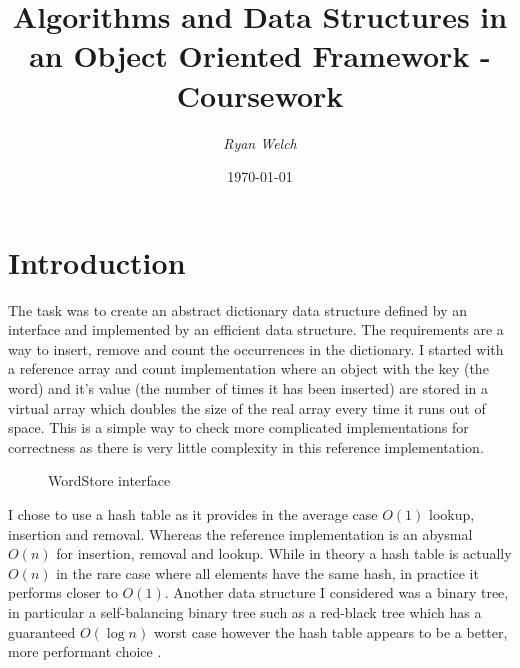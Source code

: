 \documentclass[12pt]{article}
\title{Algorithms and Data Structures in an Object Oriented Framework - Coursework}
\author{\textit{Ryan Welch}}
\date{\today}
\begin{document}
\maketitle
\thispagestyle{fancy}

\tableofcontents

\clearpage

\section{Introduction}
The task was to create an abstract dictionary data structure defined by an interface and implemented by an efficient data structure. The requirements are a way to insert, remove and count the occurrences in the dictionary. I started with a reference array and count implementation where an object with the key (the word) and it's value (the number of times it has been inserted) are stored in a virtual array which doubles the size of the real array every time it runs out of space. This is a simple way to check more complicated implementations for correctness as there is very little complexity in this reference implementation.

\begin{figure}[!htp]
\centering
{}
\caption{WordStore interface}
\label{lst:wordstore_interface}
\end{figure}

I chose to use a hash table as it provides in the average case $O(1)$ lookup, insertion and removal. Whereas the reference implementation is an abysmal $O(n)$ for insertion, removal and lookup. While in theory a hash table is actually $O(n)$ in the rare case where all elements have the same hash, in practice it performs closer to $O(1)$. Another data structure I considered was a binary tree, in particular a self-balancing binary tree such as a red-black tree which has a guaranteed $O(\log{}n)$ worst case however the hash table appears to be a better, more performant choice \cite{introtoalgorithms}.
\end{document}
